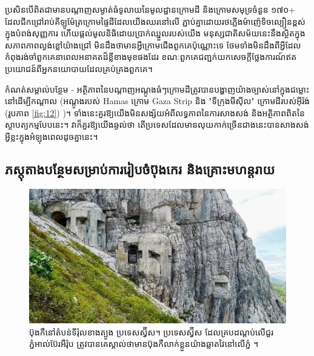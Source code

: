 \documentclass[10pt,twocolumn,letterpaper]{article}
\begin{document}
ប្រសិនបើពិតជាមានបណ្តាញសម្ងាត់ធំទូលាយនៃមូលដ្ឋានក្រោមដី និងក្រោមសមុទ្រចំនួន ១៧០+ ដែលជីកជ្រៅរាប់គីឡូម៉ែត្រក្រោមផ្ទៃដីដែលយើងឈរនៅលើ ភ្ជាប់គ្នាដោយរថភ្លើងម៉ាញ៉េទិចល្បឿនខ្ពស់ក្នុងបំពង់សុញ្ញការ ហើយផ្តល់មូលនិធិដោយប្រាក់ឈ្នួលរបស់យើង មនុស្សជាតិសម័យនេះនឹងស្ថិតក្នុងសភាពភាពល្ងង់ខ្លៅយ៉ាងជ្រៅ មិនដឹងថាមានអ្វីក្រោមជើងពួកគេប៉ុណ្ណោះទេ ថែមទាំងមិនដឹងពីអ្វីដែលកំពុងរង់ចាំពួកគេនាពេលអនាគតដ៏ខ្លីខាងមុខផងដែរ ខណៈពួកគេជញ្ជក់យកសេចក្តីថ្លែងការណ៍ឥតប្រយោជន៍ពីអ្នកនយោបាយដែលគ្រប់គ្រងពួកគេ។

កំណត់សម្គាល់បន្ថែម - អត្ថិភាពនៃបណ្តាញអណ្តូងធំៗក្រោមដីត្រូវបានបង្ហាញយ៉ាងច្បាស់នៅក្នុងជម្លោះនៅដើម្បីកណ្តាល (អណ្តូងរបស់ Hamas ក្រោម Gaza Strip \cite{38} និង "ទីក្រុងមីស៊ីល" ក្រោមដីរបស់អ៊ីរ៉ង់ (រូបភាព \ref{fig:12}) \cite{39,40})។ ទាំងនេះគួរឱ្យយើងមិនសង្ស័យអំពីលទ្ធភាពនៃការសាងសង់ និងអត្ថិភាពពិតនៃស្ថាបត្យកម្មបែបនេះ។ វាក៏គួរឱ្យយើងឆ្ងល់ថា តើប្រទេសដែលមានលុយកាក់ច្រើនជាងនេះបានសាងសង់អ្វីខ្លះក្នុងអំឡុងពេលដូចគ្នានេះ។
\subsection{ភស្តុតាងបន្ថែមសម្រាប់ការរៀបចំប៊ុងកេរ និងគ្រោះមហន្តរាយ}

\begin{figure}[t]
\begin{center}
   \includegraphics[width=1\linewidth]{tyrol.jpg}
\end{center}
   \caption{ប៊ុងកឺនៅតំបន់ទីរ៉ុលខាងត្បូង ប្រទេសស្វ៊ីស។ ប្រទេសស្វ៊ីស ដែលគ្របដណ្តប់លើជួរភ្នំអាល់ប៊ែរអឺរ៉ុប ត្រូវបានគេស្គាល់ថាមានប៊ុងកឺលាក់ខ្លួនយ៉ាងឆ្លាតវៃនៅលើភ្នំ \cite{32}។}
\label{fig:7}
\label{fig:onecol}
\end{figure}
\end{document}
